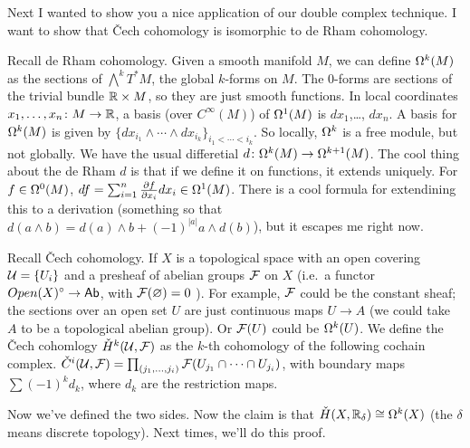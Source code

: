 Next I wanted to show you a nice application of our double complex technique. I want to show that \v Cech cohomology is isomorphic to de Rham cohomology.

Recall de Rham cohomology. Given a smooth manifold $M$, we can define $\Omega^k(M)$ as the sections of $\bigwedge^k T^*M$, the global $k$-forms on $M$. The 0-forms are sections of the trivial bundle $\mathbb{R}\times M$, so they are just smooth functions. In local coordinates $x_1,\dots, x_n\colon M\to \mathbb{R}$, a basis (over $C^\infty(M)$) of $\Omega^1(M)$ is $dx_1$,\dots, $dx_n$. A basis for $\Omega^k(M)$ is given by $\{dx_{i_1}\wedge \cdots \wedge dx_{i_k}\}_{i_1<\cdots<i_k}$. So locally, $\Omega^k$ is a free module, but not globally. We have the usual differetial $d\colon \Omega^k(M)\to \Omega^{k+1}(M)$. The cool thing about the de Rham $d$ is that if we define it on functions, it extends uniquely. For $f\in \Omega^0(M)$, $df = \sum_{i=1}^n \frac{\partial f}{\partial x_i} dx_i\in \Omega^1(M)$. There is a cool formula for extendining this to a derivation (something so that $d(a\wedge b)=d(a)\wedge b + (-1)^{|a|}a\wedge d(b)$), but it escapes me right now.

Recall \v Cech cohomology. If $X$ is a topological space with an open covering $\mathcal{U}=\{U_i\}$ and a presheaf of abelian groups $\mathcal{F}$ on $X$ (i.e.~a functor $Open(X)^\circ\to \text{\sf Ab}$, with $\mathcal{F}(\varnothing)=0$ ). For example, $\mathcal{F}$ could be the constant sheaf; the sections over an open set $U$ are just continuous maps $U\to A$ (we could take $A$ to be a topological abelian group). Or $\mathcal{F}(U)$ could be $\Omega^k(U)$. We define the \v Cech cohomlogy $\check H^k(\mathcal{U},\mathcal{F})$ as the $k$-th cohomology of the following cochain complex. $\check C^i(\mathcal{U},\mathcal{F}) = \prod_{(j_1,\dots, j_i)} \mathcal{F}(U_{j_1}\cap \cdots \cap U_{j_i})$, with boundary maps $\sum (-1)^k d_k$, where $d_k$ are the restriction maps.

Now we've defined the two sides. Now the claim is that $\check H(X,\mathbb{R}_\delta)\cong \Omega^k(X)$ (the $\delta$ means discrete topology). Next times, we'll do this proof.


